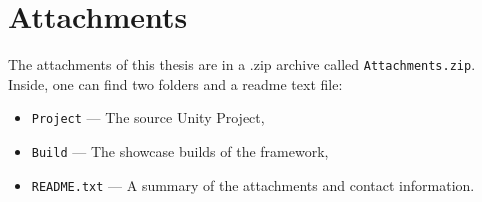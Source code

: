 \chapter{Attachments}

The attachments of this thesis are in a .zip archive called \verb|Attachments.zip|. Inside, one can find two folders and a readme text file: 
\begin{itemize}
    \item     \verb|Project| — The source Unity Project,
    \item \verb|Build| — The showcase builds of the framework,
    \item \verb|README.txt| — A summary of the attachments and contact information.
\end{itemize}